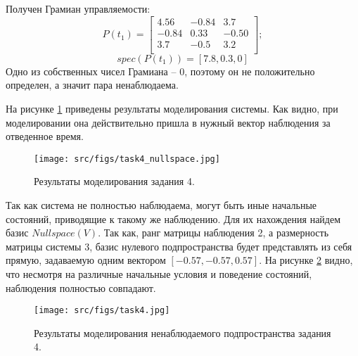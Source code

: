 Получен Грамиан управляемости:
\[
        P(t_1) = \begin{bmatrix}
        4.56 & -0.84 & 3.7 \\
        -0.84 & 0.33 & -0.50 \\
        3.7 & -0.5 & 3.2 \\
        \end{bmatrix};
\]
\[
        spec(P(t_1)) = [7.8,  0.3, 0]
\]
Одно из собственных чисел Грамиана -- 0, поэтому он не положительно определен, а значит пара ненаблюдаема.

На рисунке \ref{fig:task4} приведены результаты моделирования системы. Как видно, при моделировании она действительно пришла в нужный вектор наблюдения за отведенное время.
\begin{figure}[ht!]
        \centering
        \texttt{[image: src/figs/task4\_nullspace.jpg]}
        \caption{Результаты моделирования задания 4.}
        \label{fig:task4}
\end{figure}

Так как система не полностью наблюдаема, могут быть иные начальные состояний, приводящие к такому же наблюдению. Для их нахождения найдем базис \(Nullspace(V)\). Так как, ранг матрицы наблюдения 2, а размерность матрицы системы 3, базис нулевого подпространства будет представлять из себя прямую, задаваемую одним вектором \([-0.57, -0.57, 0.57]\).
На рисунке \ref{fig:task4_null} видно, что несмотря на различные начальные условия и поведение состояний, наблюдения полностью совпадают.
\begin{figure}[ht!]
        \centering
        \texttt{[image: src/figs/task4.jpg]}
        \caption{Результаты моделирования ненаблюдаемого подпространства задания 4.}
        \label{fig:task4_null}
\end{figure}

